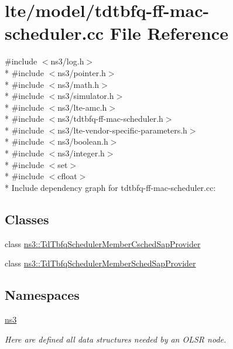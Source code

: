 \hypertarget{lte_2model_2tdtbfq-ff-mac-scheduler_8cc}{}\section{lte/model/tdtbfq-\/ff-\/mac-\/scheduler.cc File Reference}
\label{lte_2model_2tdtbfq-ff-mac-scheduler_8cc}
{\ttfamily \#include $<$ns3/log.\+h$>$}\\*
{\ttfamily \#include $<$ns3/pointer.\+h$>$}\\*
{\ttfamily \#include $<$ns3/math.\+h$>$}\\*
{\ttfamily \#include $<$ns3/simulator.\+h$>$}\\*
{\ttfamily \#include $<$ns3/lte-\/amc.\+h$>$}\\*
{\ttfamily \#include $<$ns3/tdtbfq-\/ff-\/mac-\/scheduler.\+h$>$}\\*
{\ttfamily \#include $<$ns3/lte-\/vendor-\/specific-\/parameters.\+h$>$}\\*
{\ttfamily \#include $<$ns3/boolean.\+h$>$}\\*
{\ttfamily \#include $<$ns3/integer.\+h$>$}\\*
{\ttfamily \#include $<$set$>$}\\*
{\ttfamily \#include $<$cfloat$>$}\\*
Include dependency graph for tdtbfq-\/ff-\/mac-\/scheduler.cc\+:
\subsection*{Classes}
\begin{DoxyCompactItemize}
\item 
class \hyperlink{classns3_1_1TdTbfqSchedulerMemberCschedSapProvider}{ns3\+::\+Td\+Tbfq\+Scheduler\+Member\+Csched\+Sap\+Provider}
\item 
class \hyperlink{classns3_1_1TdTbfqSchedulerMemberSchedSapProvider}{ns3\+::\+Td\+Tbfq\+Scheduler\+Member\+Sched\+Sap\+Provider}
\end{DoxyCompactItemize}
\subsection*{Namespaces}
\begin{DoxyCompactItemize}
\item 
 \hyperlink{namespacens3}{ns3}
\begin{DoxyCompactList}\small\item\em Here are defined all data structures needed by an O\+L\+SR node. \end{DoxyCompactList}\end{DoxyCompactItemize}
